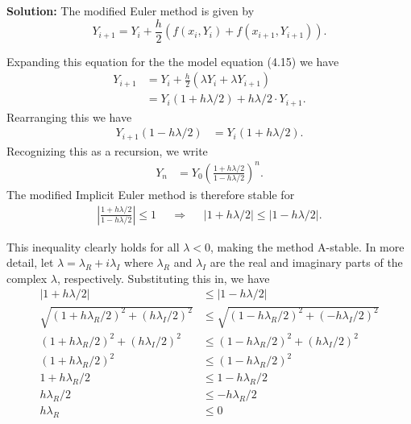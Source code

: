 \documentclass[11pt]{article}
\def\f{\frac }
\begin{document}
\begin{enumerate}
\textbf{Solution:} The modified Euler method is given by
\begin{equation} Y_{i+1} = Y_i + \f{h}{2} \left ( f(x_i,Y_i) + f(x_{i+1},Y_{i+1})\right ) . \end{equation}

Expanding this equation for the the model equation (4.15) we have
\begin{align} Y_{i+1} &= Y_i + \f{h}{2} \left ( \lambda Y_i + \lambda Y_{i+1}\right ) \\
&= Y_i (1+h\lambda /2) + h \lambda /2 \cdot Y_{i+1}. \end{align}
Rearranging this we have
\begin{align} Y_{i+1}(1-h\lambda /2) &= Y_i (1+h\lambda /2) . \end{align}
Recognizing this as a recursion, we write
\begin{align} Y_{n} &= Y_0 \left ( \frac{1+h\lambda /2 }{1-h\lambda /2} \right )^n . \end{align}
The modified Implicit Euler method is therefore stable for 
\begin{align} \left | \frac{1+h\lambda /2}{1-h\lambda /2} \right | \leq 1 ~~~~~~\Rightarrow ~~~~~~ \left | 1+h\lambda /2 \right |  \leq  \left | 1-h\lambda /2 \right |. \end{align}

This inequality clearly holds for all $\lambda < 0$, making the method A-stable.
In more detail, let $\lambda = \lambda _R + i \lambda _I$ where $\lambda_R$ and $\lambda _I$ are the real and imaginary parts of the complex $\lambda$, respectively.
Substituting this in, we have
\begin{align} \left | 1+h\lambda /2 \right |  & \leq  \left | 1-h\lambda /2 \right |\\
\sqrt{(1+h\lambda _R/2)^2 + (h\lambda_I /2)^2 }  &\leq \sqrt{(1-h\lambda _R/2)^2 + (-h\lambda_I /2)^2 } \\
(1+h\lambda _R/2)^2 + (h\lambda_I /2)^2  &\leq (1-h\lambda _R/2)^2 + (h\lambda_I /2)^2 \\
(1+h\lambda _R/2)^2 &\leq (1-h\lambda _R/2)^2 \\
1+h\lambda _R/2 &\leq 1-h\lambda _R/2 \\
h\lambda _R/2 &\leq -h\lambda _R/2 \\
h\lambda _R &\leq 0 \end{align}



\end{enumerate}
\end{document}
